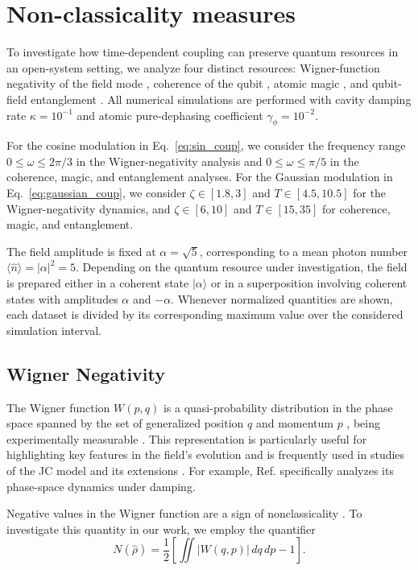 \documentclass[aps,pre,superscriptaddress,twocolumn,10pt]{revtex4-2}
\begin{document}
\section{Non-classicality measures}
\label{sec:fock_non-classicality_jc_model}
To investigate how time-dependent coupling can preserve quantum resources in an open-system setting, we analyze four distinct resources: Wigner-function negativity of the field mode \cite{Wigner1932,GERRY2005}, coherence of the qubit \cite{Streltsov2017}, atomic magic \cite{Bravyi2005}, and qubit-field entanglement \cite{Horodecki2009}.
All numerical simulations are performed with cavity damping rate $\kappa=10^{-1}$ and atomic pure-dephasing coefficient $\gamma_\phi=10^{-2}$.


For the cosine modulation in Eq.~\eqref{eq:sin_coup}, we consider the frequency range $0\leq\omega\leq2\pi/3$ in the Wigner-negativity analysis and $0\leq\omega\leq\pi/5$ in the coherence, magic, and entanglement analyses. For the Gaussian modulation in Eq.~\eqref{eq:gaussian_coup}, we consider $\zeta\in[1.8,3]$ and $T\in[4.5,10.5]$ for the Wigner-negativity dynamics, and $\zeta\in[6,10]$ and $T\in[15,35]$ for coherence, magic, and entanglement.

The field amplitude is fixed at $\alpha=\sqrt{5}$, corresponding to a mean photon number $\langle\hat n\rangle=|\alpha|^2=5$. Depending on the quantum resource under investigation, the field is prepared either in a coherent state $|\alpha\rangle$ or in a superposition involving coherent states with amplitudes $\alpha$ and $-\alpha$.
Whenever normalized quantities are shown, each dataset is divided by its corresponding maximum value over the considered simulation interval.

\subsection{Wigner Negativity}
\label{subsec:wigner}
The Wigner function $W(p,q)$ is a quasi-probability distribution in the phase space spanned by the set of generalized position $q$ and momentum $p$ \cite{Wigner1932,Garraway1992}, 
being experimentally measurable \cite{Leibfried2003}.
This representation is particularly useful for highlighting key features in the field's evolution and is frequently used in studies of the JC model and its extensions \cite{Eiselt1991,Larson2007,LARSON2021}.
For example, Ref. \cite{Eiselt1991} specifically analyzes its phase-space dynamics under damping.

Negative values in the Wigner function are a sign of nonclassicality \cite{Anatole_Kenfack_2004,Albarelli2018}. 
To investigate this quantity in our work, we employ the quantifier
\begin{equation}
   N(\hat{\rho})=\frac{1}{2}\left[\iint\left|W(q,p)\right|\,dq\,dp-1\right].
\end{equation}
\end{document}
